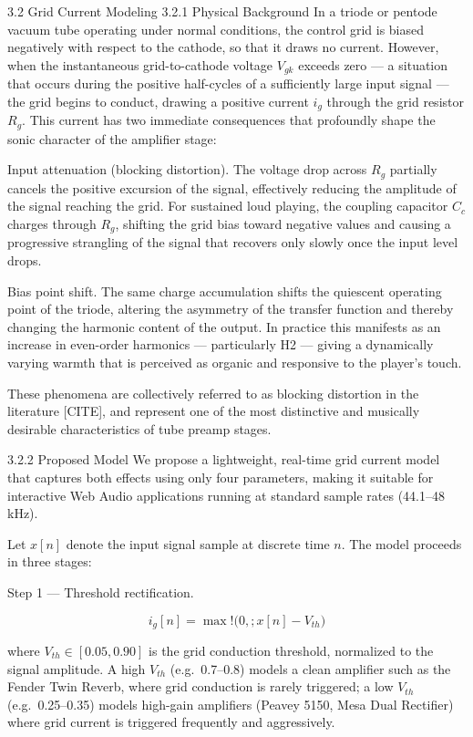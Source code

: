 3.2 Grid Current Modeling
3.2.1 Physical Background
In a triode or pentode vacuum tube operating under normal conditions, the control grid is biased negatively with respect to the cathode, so that it draws no current. However, when the instantaneous grid-to-cathode voltage $V_{gk}$ exceeds zero — a situation that occurs during the positive half-cycles of a sufficiently large input signal — the grid begins to conduct, drawing a positive current $i_g$ through the grid resistor $R_g$. This current has two immediate consequences that profoundly shape the sonic character of the amplifier stage:

Input attenuation (blocking distortion). The voltage drop across $R_g$ partially cancels the positive excursion of the signal, effectively reducing the amplitude of the signal reaching the grid. For sustained loud playing, the coupling capacitor $C_c$ charges through $R_g$, shifting the grid bias toward negative values and causing a progressive strangling of the signal that recovers only slowly once the input level drops.

Bias point shift. The same charge accumulation shifts the quiescent operating point of the triode, altering the asymmetry of the transfer function and thereby changing the harmonic content of the output. In practice this manifests as an increase in even-order harmonics — particularly H2 — giving a dynamically varying warmth that is perceived as organic and responsive to the player's touch.

These phenomena are collectively referred to as blocking distortion in the literature [CITE], and represent one of the most distinctive and musically desirable characteristics of tube preamp stages.

3.2.2 Proposed Model
We propose a lightweight, real-time grid current model that captures both effects using only four parameters, making it suitable for interactive Web Audio applications running at standard sample rates (44.1–48 kHz).

Let $x[n]$ denote the input signal sample at discrete time $n$. The model proceeds in three stages:

Step 1 — Threshold rectification.

$$ i_g[n] = \max!\bigl(0,; x[n] - V_{th}\bigr) \tag{1} $$

where $V_{th} \in [0.05, 0.90]$ is the grid conduction threshold, normalized to the signal amplitude. A high $V_{th}$ (e.g.\ 0.7–0.8) models a clean amplifier such as the Fender Twin Reverb, where grid conduction is rarely triggered; a low $V_{th}$ (e.g.\ 0.25–0.35) models high-gain amplifiers (Peavey 5150, Mesa Dual Rectifier) where grid current is triggered frequently and aggressively.

